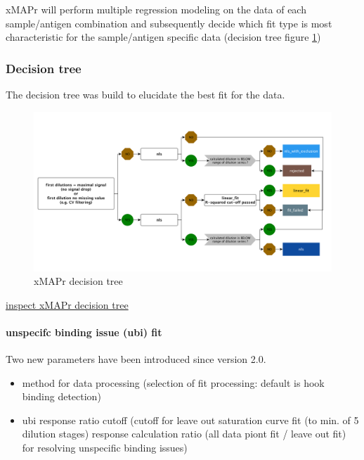 \documentclass[
]{book}
\providecommand{\tightlist}{%
  \setlength{\itemsep}{0pt}\setlength{\parskip}{0pt}}
\begin{document}
xMAPr will perform multiple regression modeling on the data of each sample/antigen combination and subsequently decide which fit type is most characteristic for the sample/antigen specific data (decision tree figure \ref{fig:xMAPrDecTree})

\hypertarget{decision-tree}{%
\subsubsection{Decision tree}\label{decision-tree}}

The decision tree was build to elucidate the best fit for the data.

\begin{figure}
\includegraphics[width=33.58in]{figures/fit_decision_tree_small} \caption{xMAPr decision tree}\label{fig:xMAPrDecTree}
\end{figure}

\href{figures/fit_decision_tree_small.png}{inspect xMAPr decision tree}

\hypertarget{unspecifc-binding-issue-ubi-fit}{%
\paragraph{unspecifc binding issue (ubi) fit}\label{unspecifc-binding-issue-ubi-fit}}

Two new parameters have been introduced since version 2.0.

\begin{itemize}
\tightlist
\item
  method for data processing (selection of fit processing: default is hook binding detection)
\item
  ubi response ratio cutoff (cutoff for leave out saturation curve fit (to min. of 5 dilution stages) response calculation ratio (all data piont fit / leave out fit) for resolving unspecific binding issues)
\end{itemize}
\end{document}
